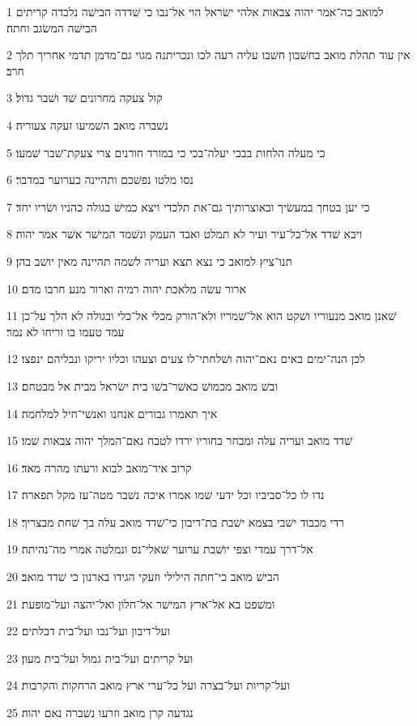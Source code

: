 \par 1 למואב כה־אמר יהוה צבאות אלהי ישׂראל הוי אל־נבו כי שׁדדה הבישׁה נלכדה קריתים הבישׁה המשׂגב וחתה׃
\par 2 אין עוד תהלת מואב בחשׁבון חשׁבו עליה רעה לכו ונכריתנה מגוי גם־מדמן תדמי אחריך תלך חרב׃
\par 3 קול צעקה מחרונים שׁד ושׁבר גדול׃
\par 4 נשׁברה מואב השׁמיעו זעקה צעוריה׃
\par 5 כי מעלה הלחות בבכי יעלה־בכי כי במורד חורנים צרי צעקת־שׁבר שׁמעו׃
\par 6 נסו מלטו נפשׁכם ותהיינה כערוער במדבר׃
\par 7 כי יען בטחך במעשׂיך ובאוצרותיך גם־את תלכדי ויצא כמישׁ בגולה כהניו ושׂריו יחד׃
\par 8 ויבא שׁדד אל־כל־עיר ועיר לא תמלט ואבד העמק ונשׁמד המישׁר אשׁר אמר יהוה׃
\par 9 תנו־ציץ למואב כי נצא תצא ועריה לשׁמה תהיינה מאין יושׁב בהן׃
\par 10 ארור עשׂה מלאכת יהוה רמיה וארור מנע חרבו מדם׃
\par 11 שׁאנן מואב מנעוריו ושׁקט הוא אל־שׁמריו ולא־הורק מכלי אל־כלי ובגולה לא הלך על־כן עמד טעמו בו וריחו לא נמר׃
\par 12 לכן הנה־ימים באים נאם־יהוה ושׁלחתי־לו צעים וצעהו וכליו יריקו ונבליהם ינפצו׃
\par 13 ובשׁ מואב מכמושׁ כאשׁר־בשׁו בית ישׂראל מבית אל מבטחם׃
\par 14 איך תאמרו גבורים אנחנו ואנשׁי־חיל למלחמה׃
\par 15 שׁדד מואב ועריה עלה ומבחר בחוריו ירדו לטבח נאם־המלך יהוה צבאות שׁמו׃
\par 16 קרוב איד־מואב לבוא ורעתו מהרה מאד׃
\par 17 נדו לו כל־סביביו וכל ידעי שׁמו אמרו איכה נשׁבר מטה־עז מקל תפארה׃
\par 18 רדי מכבוד ישׁבי בצמא ישׁבת בת־דיבון כי־שׁדד מואב עלה בך שׁחת מבצריך׃
\par 19 אל־דרך עמדי וצפי יושׁבת ערוער שׁאלי־נס ונמלטה אמרי מה־נהיתה׃
\par 20 הבישׁ מואב כי־חתה הילילי וזעקי הגידו בארנון כי שׁדד מואב׃
\par 21 ומשׁפט בא אל־ארץ המישׁר אל־חלון ואל־יהצה ועל־מופעת׃
\par 22 ועל־דיבון ועל־נבו ועל־בית דבלתים׃
\par 23 ועל קריתים ועל־בית גמול ועל־בית מעון׃
\par 24 ועל־קריות ועל־בצרה ועל כל־ערי ארץ מואב הרחקות והקרבות׃
\par 25 נגדעה קרן מואב וזרעו נשׁברה נאם יהוה׃
